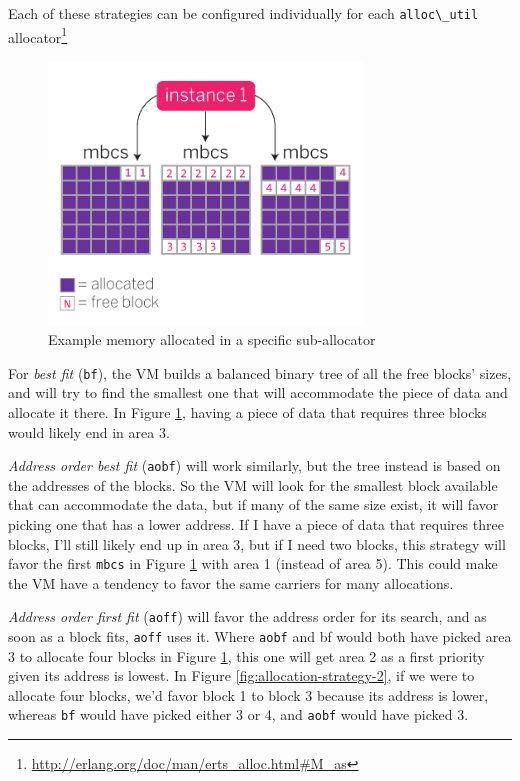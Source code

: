 \documentclass[11pt, oneside]{book}   	%
\newcommand{\term}[1]{\Verb`#1`}
\begin{document}
Each of these strategies can be configured individually for each \term{alloc\_util} allocator\footnote{\href{http://erlang.org/doc/man/erts\_alloc.html\#M\_as}{http://erlang.org/doc/man/erts\_alloc.html\#M\_as}}

\begin{figure}
  \includegraphics[max height=7cm]{allocation-strategy-1.pdf}%
  \centering%
  \caption{Example memory allocated in a specific sub-allocator}%
   \label{fig:allocation-strategy-1}
\end{figure}
\FloatBarrier

For \emph{best fit} (\term{bf}), the VM builds a balanced binary tree of all the free blocks' sizes, and will try to find the smallest one that will accommodate the piece of data and allocate it there. In Figure \ref{fig:allocation-strategy-1}, having a piece of data that requires three blocks would likely end in area 3.

\emph{Address order best fit} (\term{aobf}) will work similarly, but the tree instead is based on the addresses of the blocks. So the VM will look for the smallest block available that can accommodate the data, but if many of the same size exist, it will favor picking one that has a lower address. If I have a piece of data that requires three blocks, I'll still likely end up in area 3, but if I need two blocks, this strategy will favor the first \term{mbcs} in Figure \ref{fig:allocation-strategy-1} with area 1 (instead of area 5). This could make the VM have a tendency to favor the same carriers for many allocations.

\emph{Address order first fit} (\term{aoff}) will favor the address order for its search, and as soon as a block fits, \term{aoff} uses it. Where \term{aobf} and bf would both have picked area 3 to allocate four blocks in Figure \ref{fig:allocation-strategy-1}, this one will get area 2 as a first priority given its address is lowest. In Figure \ref{fig:allocation-strategy-2}, if we were to allocate four blocks, we'd favor block 1 to block 3 because its address is lower, whereas \term{bf} would have picked either 3 or 4, and \term{aobf} would have picked 3.
\end{document}
